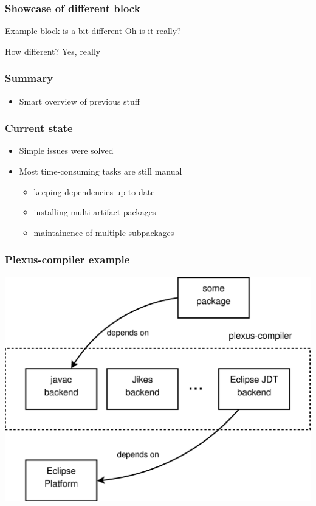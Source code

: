 \documentclass[pdftex,unicode,xcolor=table]{beamer}
\begin{document}
\begin{frame}
  \frametitle{Showcase of different block}
  \begin{exampleblock}{Example block is a bit different}
    Oh is it really?
  \end{exampleblock}

  \begin{block}{How different?}
    Yes, really
  \end{block}
\end{frame}


\begin{frame}
  \frametitle{Summary}
  \begin{itemize}
    \item Smart overview of previous stuff
  \end{itemize}
\end{frame}




\begin{frame}
  \frametitle{Current state}
  \begin{itemize}
    \item Simple issues were solved
    \item Most time-consuming tasks are still manual
    \begin{itemize}
      \item keeping dependencies up-to-date
      \item installing multi-artifact packages
      \item maintainence of multiple subpackages
    \end{itemize}
  \end{itemize}
\end{frame}


\begin{frame}[fragile]
  \frametitle{Plexus-compiler example}
  \begin{center}
    \includegraphics[scale=0.3]{plexus-compiler.eps}
  \end{center}
\end{frame}
\end{document}
